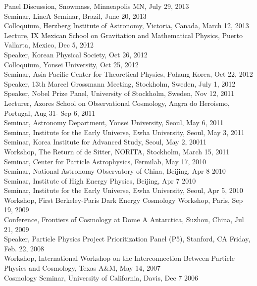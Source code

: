 \documentclass[line, margin]{res}
\begin{document}
\begin{resume}
Panel Discussion, Snowmass, Minneapolis MN, July 29, 2013\\
Seminar, LineA Seminar, Brazil, June 20, 2013\\
Colloquium, Herzberg Institute of Astronomy, Victoria, Canada, March 12, 2013\\
Lecture, IX Mexican School on Gravitation and Mathematical Physics, Puerto Vallarta, Mexico, Dec 5, 2012\\
Speaker, Korean Physical Society, Oct 26, 2012\\
Colloquium, Yonsei University, Oct 25, 2012\\
Seminar, Asia Pacific Center for Theoretical Physics, Pohang Korea, Oct 22, 2012\\
Speaker, 13th Marcel Grossmann Meeting, Stockholm, Sweden, July 1, 2012\\ 
Speaker, Nobel Prize Panel, University of Stockholm, Sweden, Nov 12, 2011\\
Lecturer, Azores School on Observational Cosmology, Angra do Heroismo, Portugal, Aug 31- Sep 6, 2011\\
Seminar, Astronomy Department, Yonsei University, Seoul, May 6, 2011\\
Seminar, Institute for the Early Universe, Ewha University, Seoul, May 3, 2011\\
Seminar, Korea Institute for Advanced Study, Seoul, May 2, 20011\\
Workshop, The Return of de Sitter, NORITA, Stockholm, March 15, 2011\\
Seminar, Center for Particle Astrophysics, Fermilab, May 17, 2010\\
Seminar, National Astronomy Observatory of China, Beijing, Apr 8 2010\\
Seminar, Institute of High Energy Physics, Beijing, Apr 7 2010\\
Seminar, Institute for the Early Universe, Ewha University, Seoul, Apr 5, 2010\\
Workshop, First Berkeley-Paris Dark Energy Cosmology Workshop, Paris, Sep 19, 2009\\
Conference, Frontiers of Cosmology at Dome A Antarctica, Suzhou, China, Jul 21, 2009\\
Speaker, Particle Physics Project Prioritization Panel (P5), Stanford, CA Friday, Feb. 22, 2008\\
Workshop, International Workshop on the Interconnection Between
Particle Physics and Cosmology, Texas A\&M, May 14, 2007 \\
Cosmology Seminar, University of California, Davis, Dec 7 2006\\

\end{resume}
\end{document}
